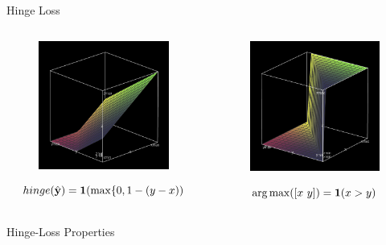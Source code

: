 \documentclass{beamer}
\begin{document}
\begin{frame}{Hinge Loss}
  \begin{columns}[t]
    \begin{column}[t]{0.5\textwidth}


      \begin{figure}
        \centering
        \includegraphics[width=5cm]{hinge}

      \end{figure}
      \[hinge(\hat{\mathbf{y}}) = \mathbf{1}(\max\{0, 1 - (y - x)) \]
    \end{column}

    \begin{column}[t]{0.5\textwidth}


      \begin{figure}
        \centering
      \includegraphics[width=5cm]{argmax}
      \end{figure}
      \[\argmax([x\ y]) = \indicator(x > y) \]      
    \end{column}
  \end{columns}
\end{frame}  




\begin{frame}{Hinge-Loss Properties}
  
\end{frame}
\end{document}
